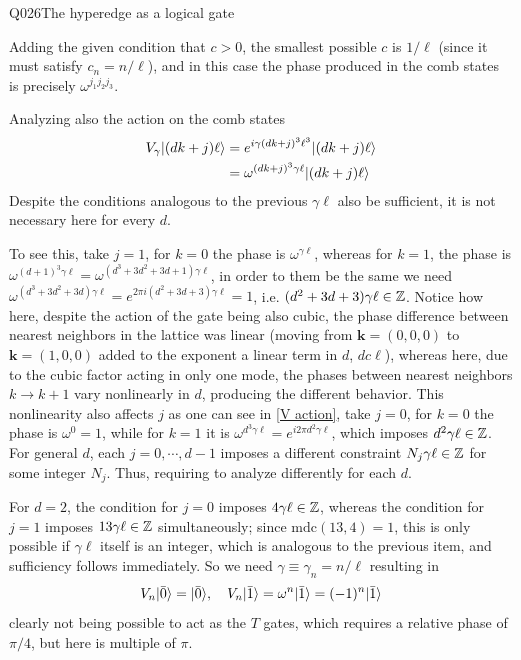 \begin{entry}{Q026}{The hyperedge as a logical gate}
\begin{solution}[Part (a)]
Adding the given condition that $c>0$, the smallest possible $c$ is $1/\ell$  (since it must satisfy $c_n = n/\ell$), and in this case the phase produced in the comb states is precisely $\omega^{j_1j_2j_3}$.


\end{solution}

\begin{solution}[Part (b)]
Analyzing also the action on the comb states
\begin{equation}
\begin{split}
    V_\gamma\lvert (dk+j)\ell \rangle  &=   e^{i  \gamma (dk +j)^3 \ell^3}  \lvert (dk+j)\ell \rangle\\
    &=   \omega^{  (dk +j)^3 \gamma\ell}  \lvert (dk+j)\ell \rangle
    \label{V action}
\end{split}
\end{equation}
Despite the conditions analogous to the previous $\gamma \ell$ also be sufficient, it is not necessary here for every $d$. 

To see this, take $j=1$, for $k=0$ the phase is $\omega^{\gamma \ell}$, whereas for $k=1$, the phase is $\omega^{(d+1)^3\gamma \ell}=\omega^{(d^3 +3d^2+3d+1)\gamma \ell}$, in order to them be the same we need
$\omega^{(d^3 +3d^2+3d)\gamma \ell} = e^{2\pi i (d^2+3d+3)\gamma \ell}=1$, i.e. $(d^2+3d+3)\gamma \ell \in \mathbb{Z}$. Notice how here, despite the action of the gate being also cubic, the phase difference between nearest neighbors in the lattice was linear (moving from $\mathbf k = (0,0,0)$ to $\mathbf k = (1,0,0)$ added to the exponent a linear term in $d$, $dc\ell$), whereas here, due to the cubic factor acting in only one mode, the phases between nearest neighbors $k \rightarrow k+1$ vary nonlinearly in $d$, producing the different behavior.
This nonlinearity also affects $j$ as one can see in \eqref{V action}, take $j=0$, for $k=0$ the phase is $\omega^0=1$, while for $k=1$ it is $\omega^{d^3 \gamma \ell}= e^{i2\pi d^2\gamma \ell}$, which imposes $d^2\gamma \ell \in \mathbb{Z}$. For general $d$, each $j=0,\cdots,d-1$ imposes a different constraint $N_j \gamma \ell \in \mathbb{Z}$ for some integer $N_j$. Thus, requiring to analyze differently for each $d$.

For $d=2$, the condition for $j=0$ imposes $4\gamma \ell \in \mathbb{Z}$, whereas the condition for $j=1$ imposes $13\gamma \ell \in \mathbb{Z}$ simultaneously; since $\text{mdc}(13,4)=1$, this is only possible if $\gamma\ell$ itself is an integer, which is analogous to the previous item, and sufficiency follows immediately. So we need $\gamma \equiv \gamma_n = n/\ell$ resulting in 
\begin{equation}
    V_n \lvert \bar 0 \rangle = \lvert \bar 0 \rangle, \quad V_n \lvert \bar 1 \rangle= \omega^{n}\lvert \bar 1 \rangle= (-1)^{n}\lvert \bar 1 \rangle 
 \end{equation}
 clearly not being possible to act as the $T$ gates, which requires a relative phase of $\pi/4$, but here is multiple of $\pi$.


\end{solution}
\end{entry}
